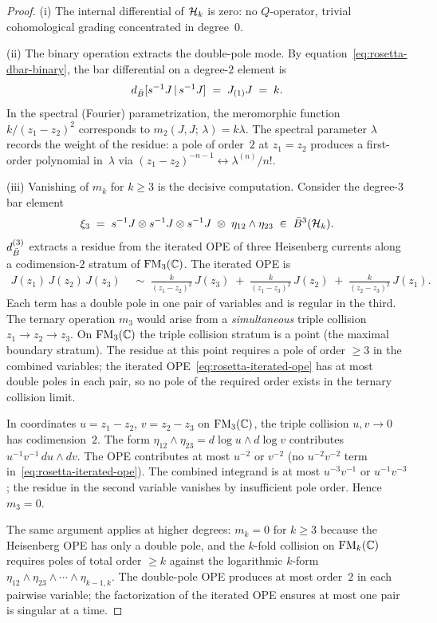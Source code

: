\begin{proof}
(i) The internal differential of $\mathcal{H}_k$ is zero: no $Q$-operator, trivial cohomological grading concentrated in degree~$0$.

\smallskip
(ii) The binary operation extracts the double-pole mode. By equation~\eqref{eq:rosetta-dbar-binary}, the bar differential on a degree-$2$ element is
\[
d_{\bar{B}}[s^{-1}J \,|\, s^{-1}J]
\;=\;
J_{(1)}J
\;=\; k.
\]
In the spectral (Fourier) parametrization, the meromorphic function $k/(z_1 - z_2)^2$ corresponds to $m_2(J, J;\, \lambda) = k\lambda$. The spectral parameter $\lambda$ records the weight of the residue: a pole of order~$2$ at $z_1 = z_2$ produces a first-order polynomial in~$\lambda$ via $(z_1 - z_2)^{-n-1} \leftrightarrow \lambda^{(n)}/n!$.

\smallskip
(iii) Vanishing of $m_k$ for $k \geq 3$ is the decisive computation. Consider the degree-$3$ bar element
\[
\xi_3
\;=\;
s^{-1}J \otimes s^{-1}J \otimes s^{-1}J
\;\otimes\;
\eta_{12} \wedge \eta_{23}
\;\in\;
\bar{B}^3(\mathcal{H}_k).
\]
$d_{\bar{B}}^{(3)}$ extracts a residue from the iterated OPE of three Heisenberg currents along a codimension-$2$ stratum of $\mathrm{FM}_3(\mathbb{C})$. The iterated OPE is
\begin{align}\label{eq:rosetta-iterated-ope}
J(z_1)\, J(z_2)\, J(z_3)
&\;\sim\;
\frac{k}{(z_1 - z_2)^2}\, J(z_3)
\;+\;
\frac{k}{(z_1 - z_3)^2}\, J(z_2)
\;+\;
\frac{k}{(z_2 - z_3)^2}\, J(z_1).
\end{align}
Each term has a double pole in one pair of variables and is regular in the third. The ternary operation $m_3$ would arise from a \emph{simultaneous} triple collision $z_1 \to z_2 \to z_3$. On $\mathrm{FM}_3(\mathbb{C})$ the triple collision stratum is a point (the maximal boundary stratum). The residue at this point requires a pole of order $\geq 3$ in the combined variables; the iterated OPE~\eqref{eq:rosetta-iterated-ope} has at most double poles in each pair, so no pole of the required order exists in the ternary collision limit.

In coordinates $u = z_1 - z_2$, $v = z_2 - z_3$ on $\mathrm{FM}_3(\mathbb{C})$, the triple collision $u, v \to 0$ has codimension~$2$. The form $\eta_{12} \wedge \eta_{23} = d\log u \wedge d\log v$ contributes $u^{-1}v^{-1}\, du \wedge dv$. The OPE contributes at most $u^{-2}$ or $v^{-2}$ (no $u^{-2}v^{-2}$ term in~\eqref{eq:rosetta-iterated-ope}). The combined integrand is at most $u^{-3}v^{-1}$ or $u^{-1}v^{-3}$; the residue in the second variable vanishes by insufficient pole order. Hence $m_3 = 0$.

The same argument applies at higher degrees: $m_k = 0$ for $k \geq 3$ because the Heisenberg OPE has only a double pole, and the $k$-fold collision on $\mathrm{FM}_k(\mathbb{C})$ requires poles of total order $\geq k$ against the logarithmic $k$-form $\eta_{12} \wedge \eta_{23} \wedge \cdots \wedge \eta_{k-1,k}$. The double-pole OPE produces at most order~$2$ in each pairwise variable; the factorization of the iterated OPE ensures at most one pair is singular at a time.
\end{proof}

